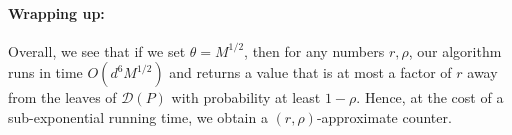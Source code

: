 \paragraph{Wrapping up: } Overall, we see that if we set $\theta = M^{1/2}$, then
for any numbers $r, \rho$, our algorithm runs in time $O(d^6 M^{1/2})$ and returns
a value that is at most a factor of $r$ away from the leaves of $\mathcal{D}(P)$ with probability at least $1 - \rho$. Hence, at the cost of a sub-exponential running time,
we obtain a $(r,\rho)$-approximate counter.


